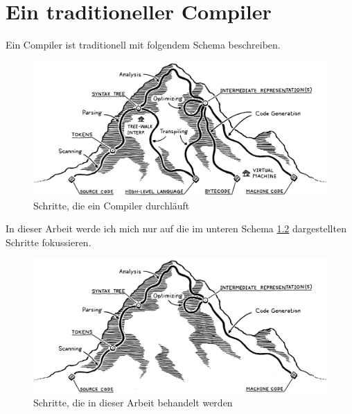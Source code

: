 \chapter{Ein traditioneller Compiler}

Ein Compiler ist traditionell mit folgendem Schema beschreiben.

\begin{figure}[h!]
    \centering
    \includegraphics[scale=0.2]{resources/images/mountain.png}
    \caption[Schritte, die ein Compiler durchläuft (https://github.com/munificent/craftinginterpreters, besucht am 5.8.2024)]{Schritte, die ein Compiler durchläuft}
    \label{fig:mountain}
\end{figure}

In dieser Arbeit werde ich mich nur auf die im unteren Schema \ref{fig:mountain-edited} dargestellten Schritte fokussieren.

\begin{figure}[h!]
    \centering
    \includegraphics[scale=0.2]{resources/images/mountain-edited.png}
    \caption[Schritte, die in dieser Arbeit behandelt werden (Basierend auf Bild \ref{fig:mountain})]{Schritte, die in dieser Arbeit behandelt werden}
    \label{fig:mountain-edited}
\end{figure}

